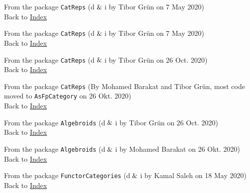 
From the package \texttt{CatReps} (d$\And$i by Tibor Grün on 7 May 2020) \\
Back to \hyperref[lol]{Index}
		

From the package \texttt{CatReps} (d$\And$i by Tibor Grün on 7 May 2020) \\
Back to \hyperref[lol]{Index}
		

From the package \texttt{CatReps} (d$\And$i by Tibor Grün on 26 Oct. 2020) \\
Back to \hyperref[lol]{Index}


From the package \texttt{CatReps} (By Mohamed Barakat and Tibor Grün, most code moved to \texttt{AsFpCategory} on 26 Okt. 2020) \\
Back to \hyperref[lol]{Index}


From the package \texttt{Algebroids} (d$\And$i by Tibor Grün on 26 Oct. 2020) \\
Back to \hyperref[lol]{Index}


From the package \texttt{Algebroids} (d$\And$i by Mohamed Barakat on 26 Okt. 2020) \\
Back to \hyperref[lol]{Index}
		

From the package \texttt{FunctorCategories} (d$\And$i by Kamal Saleh on 18 May 2020) \\
Back to \hyperref[lol]{Index}

